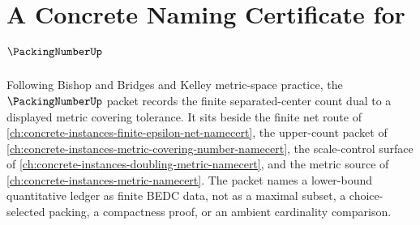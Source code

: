 \chapter{A Concrete Naming Certificate for $\PackingNumberUp$}
\label{ch:concrete-instances-packing-number-namecert}

Following Bishop and Bridges and Kelley metric-space practice, the $\PackingNumberUp$ packet records the finite separated-center count dual to a displayed metric covering tolerance. It sits beside the finite net route of \autoref{ch:concrete-instances-finite-epsilon-net-namecert}, the upper-count packet of \autoref{ch:concrete-instances-metric-covering-number-namecert}, the scale-control surface of \autoref{ch:concrete-instances-doubling-metric-namecert}, and the metric source of \autoref{ch:concrete-instances-metric-namecert}. The packet names a lower-bound quantitative ledger as finite BEDC data, not as a maximal subset, a choice-selected packing, a compactness proof, or an ambient cardinality comparison.

